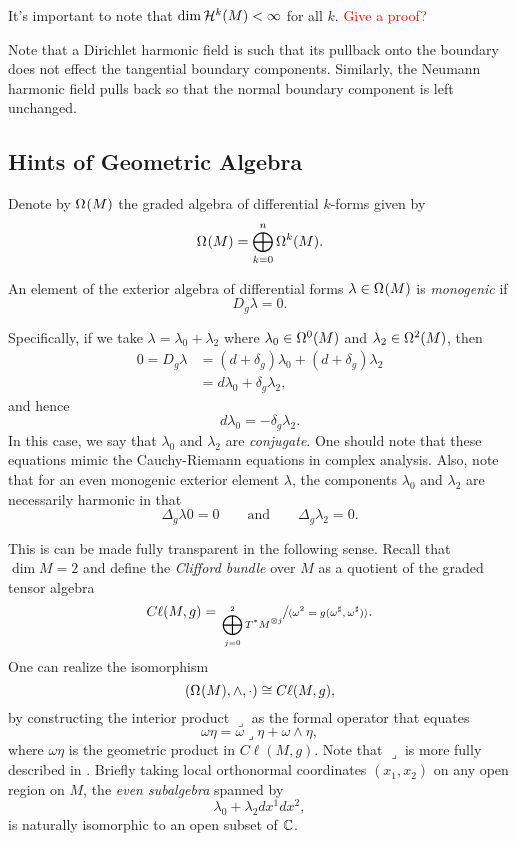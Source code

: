 \documentclass[12pt]{article}
\begin{document}
\begin{remark}
	It's important to note that $\dim \mathcal{H}_{}^{k}(M) < \infty$ for all $k$. \textcolor{red}{Give a proof?}
\end{remark}


\begin{remark}
	Note that a Dirichlet harmonic field is such that its pullback onto the boundary does not effect the tangential boundary components.  Similarly, the Neumann harmonic field pulls back so that the normal boundary component is left unchanged.
\end{remark}

\subsection{Hints of Geometric Algebra}

Denote by $\Omega_{}^{}(M)$ the graded algebra of differential $k$-forms given by
\[
\Omega_{}^{}(M) = \bigoplus_{k=0}^n \Omega_{}^{k}(M).
\]
\begin{definition}
An element of the exterior algebra of differential forms $\lambda\in \Omega_{}^{}(M)$ is \emph{monogenic} if 
\[
D_g \lambda  = 0.
\] 
\end{definition}

Specifically, if we take $\lambda = \lambda_0 + \lambda_2$ where $\lambda_0 \in \Omega_{}^{0}(M)$ and $\lambda_2 \in \Omega_{}^{2}(M)$, then
\begin{align*}
0=D_g \lambda &= (d+\delta_g) \lambda_0 + (d+\delta_g) \lambda_2 \\
&= d\lambda_0 + \delta_g \lambda_2,
\end{align*}
and hence
\begin{equation}
\label{eq:CRE}
d\lambda_0 = - \delta_g \lambda_2.
\end{equation}
In this case, we say that $\lambda_0$ and $\lambda_2$ are \emph{conjugate}.  One should note that these equations mimic the Cauchy-Riemann equations in complex analysis.  Also, note that for an even  monogenic exterior element $\lambda$, the components $\lambda_0$ and $\lambda_2$ are necessarily harmonic in that
\[
\Delta_g \lambda 0 = 0 \qquad \textrm{and} \qquad \Delta_g \lambda_2 = 0.
\]

This is can be made fully transparent in the following sense.  Recall that $\dim M = 2$ and define the \emph{Clifford bundle} over $M$ as a quotient of the graded tensor algebra
\[
C\ell(M,g) = \sfrac{\bigoplus_{j=0}^2 T^*M^{\otimes j}}{\langle \omega^2 = g(\omega^\sharp,\omega^\sharp)\rangle}.
\]
One can realize the isomorphism 
\[
(\Omega_{}^{}(M),\wedge,\cdot) \cong C\ell(M,g),
\]
by constructing the interior product $\lrcorner$ as the formal operator that equates
\[
\omega \eta = \omega \lrcorner \eta + \omega \wedge \eta,
\]
where $\omega \eta$ is the geometric product in $C\ell(M,g)$.  Note that $\lrcorner$ is more fully described in \cite{dirac-spectral}. Briefly taking local orthonormal coordinates $(x_1,x_2)$ on any open region on $M$, the \emph{even subalgebra} spanned by
\[
\lambda_0 + \lambda_2 dx^1 dx^2,
\]
is naturally isomorphic to an open subset of $\mathbb{C}$.  
\end{document}
